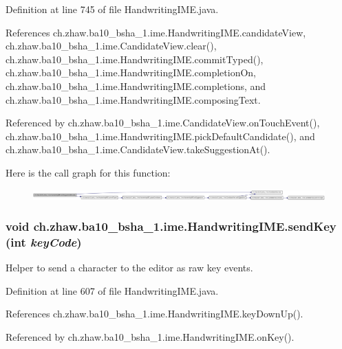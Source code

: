 Definition at line 745 of file HandwritingIME.java.

References ch.zhaw.ba10\_\-bsha\_\-1.ime.HandwritingIME.candidateView, ch.zhaw.ba10\_\-bsha\_\-1.ime.CandidateView.clear(), ch.zhaw.ba10\_\-bsha\_\-1.ime.HandwritingIME.commitTyped(), ch.zhaw.ba10\_\-bsha\_\-1.ime.HandwritingIME.completionOn, ch.zhaw.ba10\_\-bsha\_\-1.ime.HandwritingIME.completions, and ch.zhaw.ba10\_\-bsha\_\-1.ime.HandwritingIME.composingText.

Referenced by ch.zhaw.ba10\_\-bsha\_\-1.ime.CandidateView.onTouchEvent(), ch.zhaw.ba10\_\-bsha\_\-1.ime.HandwritingIME.pickDefaultCandidate(), and ch.zhaw.ba10\_\-bsha\_\-1.ime.CandidateView.takeSuggestionAt().

Here is the call graph for this function:\nopagebreak
\begin{figure}[H]
\begin{center}
\leavevmode
\includegraphics[width=420pt]{classch_1_1zhaw_1_1ba10__bsha__1_1_1ime_1_1HandwritingIME_ada3cca347b6d9a39b3fb4d008d90dac8_cgraph}
\end{center}
\end{figure}
\hypertarget{classch_1_1zhaw_1_1ba10__bsha__1_1_1ime_1_1HandwritingIME_a2711e357f6251b532e7d0bde79cadfdf}{
\subsubsection[{sendKey}]{\setlength{\rightskip}{0pt plus 5cm}void ch.zhaw.ba10\_\-bsha\_\-1.ime.HandwritingIME.sendKey (int {\em keyCode})}}
\label{classch_1_1zhaw_1_1ba10__bsha__1_1_1ime_1_1HandwritingIME_a2711e357f6251b532e7d0bde79cadfdf}
Helper to send a character to the editor as raw key events. 

Definition at line 607 of file HandwritingIME.java.

References ch.zhaw.ba10\_\-bsha\_\-1.ime.HandwritingIME.keyDownUp().

Referenced by ch.zhaw.ba10\_\-bsha\_\-1.ime.HandwritingIME.onKey().

